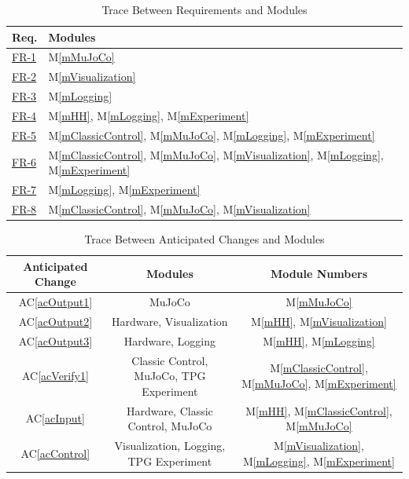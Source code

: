 \documentclass[12pt, titlepage]{article}
\newcommand{\acref}[1]{AC\ref{#1}}
\newcommand{\mref}[1]{M\ref{#1}}
\begin{document}
\begin{table}[H]
\centering
\begin{tabular}{p{} p{}}
\toprule
\textbf{Req.} & \textbf{Modules}\\
\midrule
\href{https://github.com/TPGEngine/tpg/blob/main/docs/SRS/SRS.pdf}{FR-1} & \mref{mMuJoCo}\\
\href{https://github.com/TPGEngine/tpg/blob/main/docs/SRS/SRS.pdf}{FR-2} & \mref{mVisualization}\\
\href{https://github.com/TPGEngine/tpg/blob/main/docs/SRS/SRS.pdf}{FR-3} & \mref{mLogging}\\
\href{https://github.com/TPGEngine/tpg/blob/main/docs/SRS/SRS.pdf}{FR-4} & \mref{mHH}, \mref{mLogging}, \mref{mExperiment}\\
\href{https://github.com/TPGEngine/tpg/blob/main/docs/SRS/SRS.pdf}{FR-5} & \mref{mClassicControl}, \mref{mMuJoCo}, \mref{mLogging}, \mref{mExperiment}\\
\href{https://github.com/TPGEngine/tpg/blob/main/docs/SRS/SRS.pdf}{FR-6} & \mref{mClassicControl}, \mref{mMuJoCo}, \mref{mVisualization}, \mref{mLogging}, \mref{mExperiment}\\
\href{https://github.com/TPGEngine/tpg/blob/main/docs/SRS/SRS.pdf}{FR-7} & \mref{mLogging}, \mref{mExperiment}\\
\href{https://github.com/TPGEngine/tpg/blob/main/docs/SRS/SRS.pdf}{FR-8} & \mref{mClassicControl}, \mref{mMuJoCo}, \mref{mVisualization}\\
\bottomrule
\end{tabular}
\caption{Trace Between Requirements and Modules}
\label{TblRT}
\end{table}

\begin{table}[H]
  \centering
  \begin{tabular}{|c|c|c|} \hline 
  \toprule
  Anticipated Change
  & Modules & Module Numbers
  \\
  \midrule
  \acref{acOutput1}
  & MuJoCo & \mref{mMuJoCo}
  \\
  \acref{acOutput2}
  & Hardware, Visualization & \mref{mHH}, \mref{mVisualization}
  \\
  \acref{acOutput3}
  & Hardware, Logging & \mref{mHH}, \mref{mLogging}
  \\
  \acref{acVerify1}
  & Classic Control, MuJoCo, TPG Experiment  & \mref{mClassicControl}, \mref{mMuJoCo}, \mref{mExperiment}
  \\
  \acref{acInput}
  & Hardware, Classic Control, MuJoCo & \mref{mHH}, \mref{mClassicControl}, \mref{mMuJoCo}
  \\
  \acref{acControl}
  & Visualization, Logging, TPG Experiment & \mref{mVisualization}, \mref{mLogging}, \mref{mExperiment}
  \\
  \bottomrule
  \end{tabular}
  \caption{Trace Between Anticipated Changes and Modules}
  \label{TblACT}
  \end{table}
\end{document}
